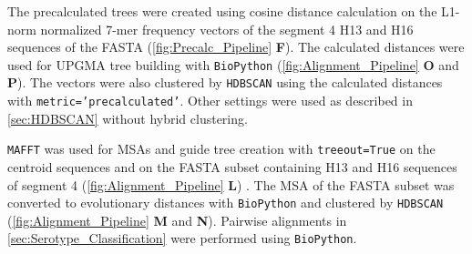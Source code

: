 The precalculated trees were created using cosine distance calculation on the L1-norm normalized 7-mer frequency vectors of the segment 4 H13 and H16 sequences of the FASTA (\autoref{fig:Precalc_Pipeline} \textsf{\textbf{F}}). The calculated distances were used for \gls{UPGMA} tree building with \texttt{BioPython} (\autoref{fig:Alignment_Pipeline} \textsf{\textbf{O}} and \textsf{\textbf{P}}). The vectors were also clustered by \texttt{HDBSCAN} using the calculated distances with \texttt{metric='precalculated'}. Other settings were used as described in \autoref{sec:HDBSCAN} without hybrid clustering.

\vspace{1em}

\texttt{MAFFT} was used for \glspl{MSA} and guide tree creation with \texttt{treeout=True} on the centroid sequences and on the FASTA subset containing H13 and H16 sequences of segment 4 (\autoref{fig:Alignment_Pipeline} \textsf{\textbf{L}}) \autocite{katoh_mafft_2013}. The \gls{MSA} of the FASTA subset was converted to evolutionary distances with \texttt{BioPython} and clustered by \texttt{HDBSCAN} (\autoref{fig:Alignment_Pipeline} \textsf{\textbf{M}} and \textsf{\textbf{N}}). Pairwise alignments in \autoref{sec:Serotype_Classification} were performed using \texttt{BioPython}.